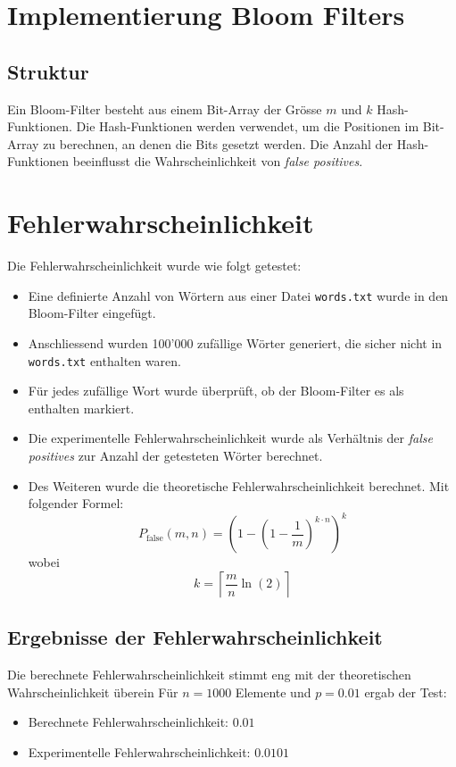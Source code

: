 \documentclass[a4paper, 12pt]{article}
\begin{document}
\section{Implementierung Bloom Filters}\label{sec:implementierung-bloom-filters}
\subsection{Struktur}\label{subsec:struktur}
Ein Bloom-Filter besteht aus einem Bit-Array der Grösse $m$ und $k$ Hash-Funktionen.
Die Hash-Funktionen werden verwendet, um die Positionen im Bit-Array zu berechnen, an denen die Bits gesetzt werden.
Die Anzahl der Hash-Funktionen beeinflusst die Wahrscheinlichkeit von \textit{false positives}.

\section{Fehlerwahrscheinlichkeit}
Die Fehlerwahrscheinlichkeit wurde wie folgt getestet:
\begin{itemize}
    \item Eine definierte Anzahl von Wörtern aus einer Datei \texttt{words.txt} wurde in den Bloom-Filter eingefügt.
    \item Anschliessend wurden 100'000 zufällige Wörter generiert, die sicher nicht in \texttt{words.txt} enthalten waren.
    \item Für jedes zufällige Wort wurde überprüft, ob der Bloom-Filter es als enthalten markiert.
    \item Die experimentelle Fehlerwahrscheinlichkeit wurde als Verhältnis der \textit{false positives} zur Anzahl der getesteten Wörter berechnet.
    \item Des Weiteren wurde die theoretische Fehlerwahrscheinlichkeit berechnet. Mit folgender Formel:
    \[
        P_{\text{false}}(m, n) = \left( 1 - \left( 1 - \frac{1}{m} \right)^{k \cdot n} \right)^k
    \]
    wobei
    \[
        k = \left\lceil \frac{m}{n} \ln(2) \right\rceil
    \]
\end{itemize}

\subsection{Ergebnisse der Fehlerwahrscheinlichkeit}\label{subsec:ergebnisse-der-fehlerwahrscheinlichkeit}
Die berechnete Fehlerwahrscheinlichkeit stimmt eng mit der theoretischen Wahrscheinlichkeit überein
Für $n = 1000$ Elemente und $p = 0.01$ ergab der Test:
\begin{itemize}
    \item Berechnete Fehlerwahrscheinlichkeit: $0.01$
    \item Experimentelle Fehlerwahrscheinlichkeit: $0.0101$
\end{itemize}
\end{document}
